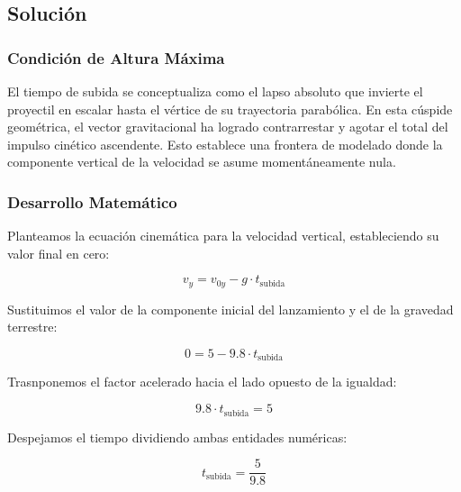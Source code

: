 \documentclass[12pt, a4paper]{article}
\begin{document}
\vspace{0.5cm}

\begin{center}
\end{center}

\subsection*{Solución}

\subsubsection*{Condición de Altura Máxima}

El tiempo de subida se conceptualiza como el lapso absoluto que invierte el proyectil en escalar hasta el vértice de su trayectoria parabólica. En esta cúspide geométrica, el vector gravitacional ha logrado contrarrestar y agotar el total del impulso cinético ascendente. Esto establece una frontera de modelado donde la componente vertical de la velocidad se asume momentáneamente nula.

\subsubsection*{Desarrollo Matemático}

Planteamos la ecuación cinemática para la velocidad vertical, estableciendo su valor final en cero:

$$v_y = v_{0y} - g \cdot t_{\text{subida}}$$

Sustituimos el valor de la componente inicial del lanzamiento y el de la gravedad terrestre:

$$0 = 5 - 9.8 \cdot t_{\text{subida}}$$

Trasnponemos el factor acelerado hacia el lado opuesto de la igualdad:

$$9.8 \cdot t_{\text{subida}} = 5$$

Despejamos el tiempo dividiendo ambas entidades numéricas:

$$t_{\text{subida}} = \frac{5}{9.8}$$
\end{document}

